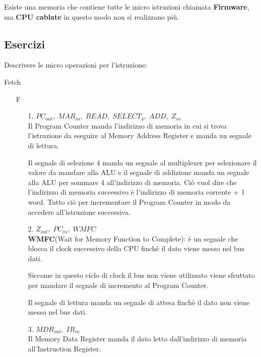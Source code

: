 \documentclass[a4paper]{article}
\theoremstyle{break}
\theoremstyle{break}
\theoremstyle{break}
\theoremstyle{break}
\begin{document}
\noindent Esiste una memoria che contiene tutte le micro istruzioni chiamata \textbf{Firmware},
ma \textbf{CPU cablate} in questo modo non si realizzano più.

\subsection{Esercizi}

\begin{exercise}
	Descrivere le micro operazioni per l'istruzione:
	\begin{center}
		Fetch
	\end{center}

	\begin{enumerate}
		\item[F]
		      \begin{enumerate}
			      \item[1.] \( PC_{out},\; MAR_{in},\; READ ,\; SELECT_4,\; ADD,\; Z_{in}\) \\
			            Il Program Counter manda l'indirizzo di memoria in cui si trova l'istruzione da eseguire
			            al Memory Address Register e manda un segnale di lettura.

			            Il segnale di selezione 4 manda un segnale al multiplexer per selezionare il valore
			            da mandare alla ALU e il segnale di addizione manda un segnale alla ALU per sommare
			            4 all'indirizzo di memoria. Ciò vuol dire che l'indirizzo di memoria successivo è
			            l'indirizzo di memoria corrente + 1 word. Tutto ciò per incrementare il Program
			            Counter in modo da accedere all'istruzione successiva.

			      \item[2.] \( Z_{out},\; PC_{in},\;WMFC \)  \\
			            \textbf{WMFC}(Wait for Memory Function to Complete): è un segnale che blocca il clock
			            successivo della CPU finchè il dato viene messo nel bus dati.

			            Siccome in questo ciclo di clock il bus non viene utilizzato viene sfruttato per
			            mandare il segnale di incremento al Program Counter.

			            Il segnale di lettura manda un segnale di attesa finchè il dato non viene messo nel bus dati.
			      \item[3.] \( MDR_{out},\; IR_{in} \) \\
			            Il Memory Data Register manda il dato letto dall'indirizzo di memoria all'Instruction Register.
		      \end{enumerate}
	\end{enumerate}
\end{exercise}
\end{document}
